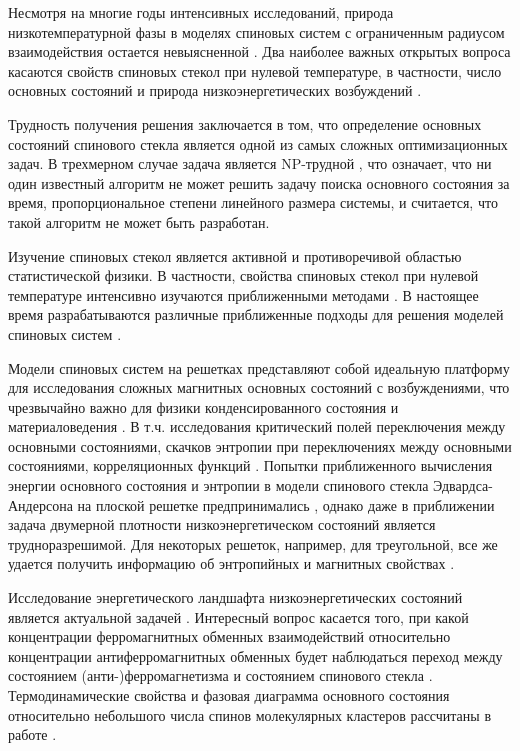 \documentclass[utf8, babel, sor, jor, amsmath,amssymb, reprint]{elsarticle} %
\begin{document}
Несмотря на многие годы интенсивных исследований, природа низкотемпературной фазы в моделях спиновых систем с ограниченным радиусом взаимодействия остается невыясненной \cite{newman2023proof}. Два наиболее важных открытых вопроса касаются свойств спиновых стекол при нулевой температуре, в частности, число основных состояний и природа низкоэнергетических возбуждений \cite{newman2022ground}.

Трудность получения решения заключается в том, что определение основных состояний спинового стекла является одной из самых сложных оптимизационных задач. В трехмерном случае задача является NP-трудной \cite{barahona1982computational}, что означает, что ни один известный алгоритм не может решить задачу поиска основного состояния за время, пропорциональное степени линейного размера системы, и считается, что такой алгоритм не может быть разработан. 

Изучение спиновых стекол является активной и противоречивой областью статистической физики. В частности, свойства спиновых стекол при нулевой температуре интенсивно изучаются приближенными методами \cite{perez2012ground}. В настоящее время разрабатываются различные приближенные подходы для решения моделей спиновых систем \cite{farias2024differentiable, makarova2023canonical}. 

Модели спиновых систем на решетках представляют собой идеальную платформу для исследования сложных магнитных основных состояний с возбуждениями, что чрезвычайно важно для физики конденсированного состояния и материаловедения \cite{lacroix2011introduction}. В т.ч. исследования критический полей переключения между основными состояниями, скачков энтропии при переключениях между основными состояниями, корреляционных функций \cite{ramirez2004effect, rosas2004random, andriushchenko2019large}. Попытки приближенного вычисления энергии основного состояния и энтропии в модели спинового стекла Эдвардса-Андерсона на плоской решетке предпринимались \cite{perez2012ground}, однако даже в приближении задача двумерной плотности низкоэнергетическом состояний является трудноразрешимой. Для некоторых решеток, например, для треугольной, все же удается получить информацию об энтропийных и магнитных свойствах \cite{jurvcivsinova2024classical}.

Исследование энергетического ландшафта низкоэнергетических состояний является актуальной задачей \cite{biswas2023energy}. Интересный вопрос касается того, при какой концентрации ферромагнитных обменных взаимодействий относительно концентрации антиферромагнитных обменных будет наблюдаться переход между состоянием (анти-)ферромагнетизма и состоянием спинового стекла \cite{zimmer2022role}. Термодинамические свойства и фазовая диаграмма основного состояния относительно небольшого числа спинов молекулярных кластеров рассчитаны в работе \cite{dias2023ground}.
\end{document}
